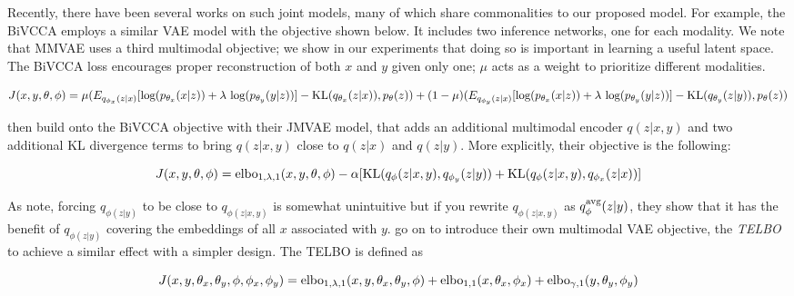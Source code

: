 \documentclass{article}
\begin{document}
Recently, there have been several works on such joint models, many of which share commonalities to our proposed model. For example, the BiVCCA employs a similar VAE model with the objective shown below. It includes two inference networks, one for each modality. We note that MMVAE uses a third multimodal objective; we show in our experiments that doing so is important in learning a useful latent space. The BiVCCA loss encourages proper reconstruction of both $x$ and $y$ given only one; $\mu$ acts as a weight to prioritize different modalities. 

\begin{equation}
    J(x, y, \theta, \phi) = \mu (E_{q_{\phi_{x}}(z|x)}[\textup{log}(p_{\theta_{x}}(x|z)) + \lambda \textup{ log}(p_{\theta_{y}}(y|z))] - \textup{KL}(q_{\theta_{x}}(z|x)), p_{\theta}(z)) + (1 - \mu) (E_{q_{\phi_{y}}(z|x)}[\textup{log}(p_{\theta_{x}}(x|z)) + \lambda \textup{ log}(p_{\theta_{y}}(y|z))] - \textup{KL}(q_{\theta_{y}}(z|y)), p_{\theta}(z))
\end{equation}

\citet{suzuki2016joint} then build onto the BiVCCA objective with their JMVAE model, that adds an additional multimodal encoder $q(z|x,y)$ and two additional KL divergence terms to bring $q(z|x,y)$ close to $q(z|x)$ and $q(z|y)$. More explicitly, their objective is the following:

\begin{equation}
    J(x, y, \theta, \phi) = \textup{elbo}_{1, \lambda, 1}(x, y, \theta, \phi) - \alpha[\textup{KL}(q_{\phi}(z|x,y), q_{\phi_{y}}(z|y)) + \textup{KL}(q_{\phi}(z|x,y), q_{\phi_{x}}(z|x))]
\end{equation}

As \citet{vedantam2017generative} note, forcing $q_{\phi(z|y)}$ to be close to $q_{\phi(z|x, y)}$ is somewhat unintuitive but if you rewrite $q_{\phi(z|x, y)}$ as $q_{\phi}^{\textup{avg}}(z|y)$, they show that it has the benefit of $q_{\phi(z|y)}$ covering the embeddings of all $x$ associated with $y$. \citet{vedantam2017generative} go on to introduce their own multimodal VAE objective, the \textit{TELBO} to achieve a similar effect with a simpler design. The TELBO is defined as

\begin{equation}
    J(x, y, \theta_{x}, \theta_{y}, \phi, \phi_{x}, \phi_{y}) = \textup{elbo}_{1, \lambda, 1}(x, y, \theta_{x}, \theta_{y}, \phi) + \textup{elbo}_{1, 1}(x, \theta_{x}, \phi_{x}) + \textup{elbo}_{\gamma, 1}(y, \theta_{y}, \phi_{y})
\end{equation}
\end{document}
